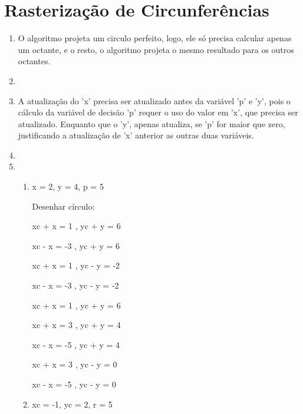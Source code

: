 \section*{Rasterização de Circunferências}

	\begin{enumerate} \addtocounter{enumi}{15}
		\item 
		O algoritmo projeta um circulo perfeito, logo, ele só precisa calcular apenas um
		octante, e o resto, o algoritmo projeta o mesmo resultado para os outros octantes.
		
		\item 

		\item 
		A atualização do 'x' precisa ser atualizado antes da variável 'p' e 'y', pois o cálculo
		da variável de decisão 'p' requer o uso do valor em 'x', que precisa ser atualizado. 
		Enquanto que o 'y', apenas atualiza, se 'p' for maior que zero, justificando a atualização
		de 'x' anterior as outras duas variáveis.
		 
		\item 

		\item
		\begin{enumerate}[label=\alph*]
			\item 
		
            x = 2, y = 4, p = 5

                Desenhar círculo:
                
                   xc + x = 1 , yc + y = 6
                   
                   xc - x = -3 , yc + y = 6
                   
                   xc + x = 1 , yc - y = -2
                   
                   xc - x = -3 , yc - y = -2
                   
                   xc + x = 1 , yc + y = 6
                   
                   xc + x = 3 , yc + y = 4
                   
                   xc - x = -5 , yc + y = 4
                   
                  xc + x = 3 , yc - y = 0
                  
                  xc - x = -5 , yc - y = 0
            
            \item 
			 xc = -1, yc = 2, r = 5            
            

\end{enumerate}
\end{enumerate}
